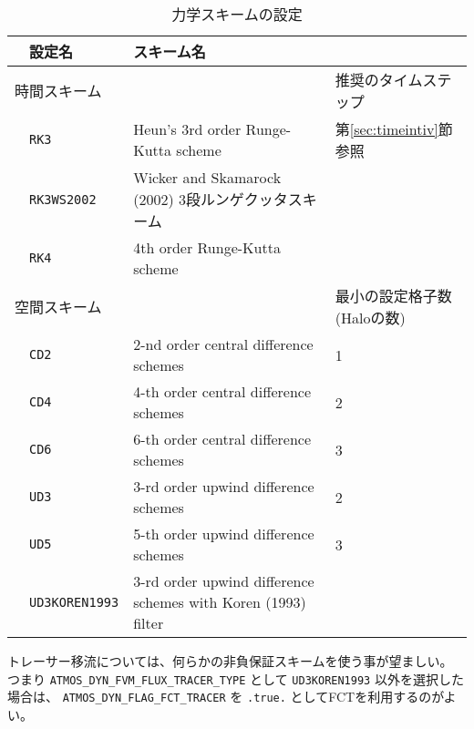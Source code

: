 \begin{table}[h]
\begin{center}
  \caption{力学スキームの設定}
  \label{tab:nml_atm_dyn}
  \begin{tabularx}{150mm}{llXX} \hline
    \rowcolor[gray]{0.9} & \multicolumn{1}{l}{設定名} & \multicolumn{1}{l}{スキーム名} & \\ \hline
    \multicolumn{3}{l}{時間スキーム} & 推奨のタイムステップ \\ \hline
    & \multicolumn{1}{l}{\verb|RK3|} & \multicolumn{1}{l}{Heun's 3rd order Runge-Kutta scheme} & \multicolumn{1}{l}{第\ref{sec:timeintiv}節参照}\\
    & \multicolumn{1}{l}{\verb|RK3WS2002|} & \multicolumn{1}{X}{Wicker and Skamarock (2002) 3段ルンゲクッタスキーム} & \\
    & \multicolumn{1}{l}{\verb|RK4|} & \multicolumn{1}{l}{4th order Runge-Kutta scheme} & \\
    \hline
    \multicolumn{3}{l}{空間スキーム} & 最小の設定格子数(Haloの数)\\ \hline
    & \multicolumn{1}{l}{\verb|CD2|} & \multicolumn{1}{l}{2-nd order central difference schemes} & \multicolumn{1}{l}{1}\\
    & \multicolumn{1}{l}{\verb|CD4|} & \multicolumn{1}{l}{4-th order central difference schemes} & \multicolumn{1}{l}{2}\\
    & \multicolumn{1}{l}{\verb|CD6|} & \multicolumn{1}{l}{6-th order central difference schemes} & \multicolumn{1}{l}{3}\\
    & \multicolumn{1}{l}{\verb|UD3|} & \multicolumn{1}{l}{3-rd order upwind difference schemes} & \multicolumn{1}{l}{2}\\
    & \multicolumn{1}{l}{\verb|UD5|} & \multicolumn{1}{l}{5-th order upwind difference schemes} & \multicolumn{1}{l}{3}\\
    & \multicolumn{1}{l}{\verb|UD3KOREN1993|} & \multicolumn{1}{X}{3-rd order upwind difference schemes with Koren (1993) filter} & \\
\hline
  \end{tabularx}
\end{center}
\end{table}

トレーサー移流については、何らかの非負保証スキームを使う事が望ましい。\\
つまり \verb|ATMOS_DYN_FVM_FLUX_TRACER_TYPE| として \verb|UD3KOREN1993| 以外を選択した場合は、
\verb|ATMOS_DYN_FLAG_FCT_TRACER| を \verb|.true.| としてFCTを利用するのがよい。


